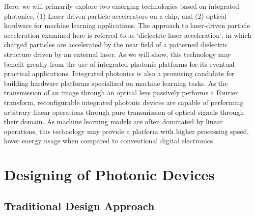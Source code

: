 Here, we will primarily explore two emerging technologies based on integrated photonics, (1) Laser-driven particle accelerators on a chip, and (2) optical hardware for machine learning applications.
The approach to laser-driven particle acceleration examined here is referred to as `dielectric laser acceleration', in which charged particles are accelerated by the near field of a patterned dielectric structure driven by an external laser.
As we will show, this technology may benefit greatly from the use of integrated photonic platforms for its eventual practical applications.
Integrated photonics is also a promising candidate for building hardware platforms specialized on machine learning tasks.
As the transmission of an image through an optical lens passively performs a Fourier transform, reconfigurable integrated photonic devices are capable of performing arbitrary linear operations through pure transmission of optical signals through their domain.
As machine learning models are often dominated by linear operations, this technology may provide a platform with higher processing speed, lower energy usage when compared to conventional digital electronics.

\section{Designing of Photonic Devices}

\subsection{Traditional Design Approach}

